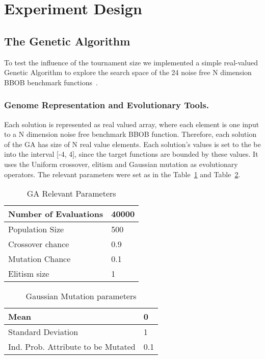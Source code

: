 \section{Experiment Design}

\subsection{The Genetic Algorithm}\label{sec:proposed:ga}

To test the influence of the tournament size we implemented a simple real-valued Genetic Algorithm to explore the search space of the 24 noise free N dimension BBOB benchmark functions~\cite{hansen2010real}.

\subsubsection*{Genome Representation and Evolutionary Tools.}
Each solution is represented as real valued array, where each element is one input to a N dimension noise free benchmark BBOB function. Therefore, each solution of the GA has size of N real value elements. Each solution's values is set to the be into the interval [-4, 4], since the target functions are bounded by these values. It uses the Uniform crossover, elitism and Gaussian mutation as evolutionary operators. The relevant parameters were set as in the Table~\ref{relevant_par} and Table~\ref{gaussian_par}.

\vspace{3mm}
\begin{table}[!ht]
	\centering
	\begin{tabular}{|l|l|}
	\hline
	Number of Evaluations & 40000 \\ \hline
	Population Size &  500		\\ \hline
	Crossover chance 	& 0.9	\\ \hline
	Mutation Chance 	& 0.1	\\ \hline		
	Elitism size 		& 1		\\ \hline		
	\end{tabular}
	\caption{GA Relevant Parameters}
	\label{relevant_par}
\end{table}
	\vspace{-2mm}
%
\begin{table}[!ht]
	\centering
	\begin{tabular}{|l|l|}
	\hline
		Mean & 0 \\ \hline		
		Standard Deviation & 1 \\ \hline		
		Ind. Prob. Attribute to be Mutated &  0.1 \\ \hline		
	\end{tabular}
	\caption{Gaussian Mutation parameters}
	\label{gaussian_par}
\end{table}

